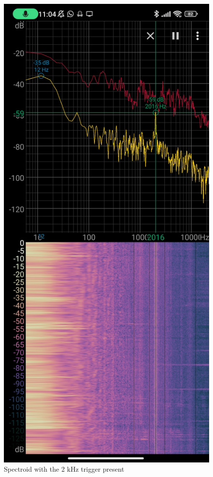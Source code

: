 \documentclass{report}
\theoremstyle{definition}
\theoremstyle{remark}
\begin{document}
\begin{figure}[!hbt]
    \centering
    \includegraphics[scale=0.1]{img/spectroid.jpg}
    \caption{Spectroid with the 2 kHz trigger present}
    \label{fig:enter-label}
\end{figure}
\end{document}
